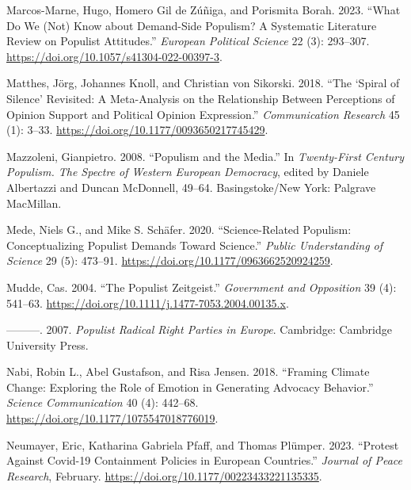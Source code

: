 \documentclass[
]{ccr}
\newlength{\cslhangindent}
\newlength{\cslentryspacingunit} %
\newenvironment{CSLReferences}[2] %
 {%
  \setlength{\parindent}{0pt}
  \ifodd #1
  \let\oldpar\par
  \def\par{\hangindent=\cslhangindent\oldpar}
  \fi
  \setlength{\parskip}{#2\cslentryspacingunit}
 }%
 {}
\begin{document}
\begin{CSLReferences}{1}{0}
\leavevmode{}%
Marcos-Marne, Hugo, Homero Gil de Zúñiga, and Porismita Borah. 2023.
{``What Do We (Not) Know about Demand-Side Populism? {A} Systematic
Literature Review on Populist Attitudes.''} \emph{European Political
Science} 22 (3): 293--307.
\url{https://doi.org/10.1057/s41304-022-00397-3}.

\leavevmode{}%
Matthes, Jörg, Johannes Knoll, and Christian von Sikorski. 2018. {``The
{`{Spiral} of {Silence}'} {Revisited}: {A Meta-Analysis} on the
{Relationship Between Perceptions} of {Opinion Support} and {Political
Opinion Expression}.''} \emph{Communication Research} 45 (1): 3--33.
\url{https://doi.org/10.1177/0093650217745429}.

\leavevmode{}%
Mazzoleni, Gianpietro. 2008. {``Populism and the Media.''} In
\emph{Twenty-First Century Populism. {The} Spectre of {Western European}
Democracy}, edited by Daniele Albertazzi and Duncan McDonnell, 49--64.
{Basingstoke/New York}: {Palgrave MacMillan}.

\leavevmode{}%
Mede, Niels G., and Mike S. Schäfer. 2020. {``Science-Related Populism:
{Conceptualizing} Populist Demands Toward Science.''} \emph{Public
Understanding of Science} 29 (5): 473--91.
\url{https://doi.org/10.1177/0963662520924259}.

\leavevmode{}%
Mudde, Cas. 2004. {``The Populist Zeitgeist.''} \emph{Government and
Opposition} 39 (4): 541--63.
\url{https://doi.org/10.1111/j.1477-7053.2004.00135.x}.

\leavevmode{}%
---------. 2007. \emph{Populist Radical Right Parties in {Europe}}.
{Cambridge}: {Cambridge University Press}.

\leavevmode{}%
Nabi, Robin L., Abel Gustafson, and Risa Jensen. 2018. {``Framing
{Climate Change}: {Exploring} the {Role} of {Emotion} in {Generating
Advocacy Behavior}.''} \emph{Science Communication} 40 (4): 442--68.
\url{https://doi.org/10.1177/1075547018776019}.

\leavevmode{}%
Neumayer, Eric, Katharina Gabriela Pfaff, and Thomas Plümper. 2023.
{``Protest Against {Covid-19} Containment Policies in {European}
Countries.''} \emph{Journal of Peace Research}, February.
\url{https://doi.org/10.1177/00223433221135335}.


\end{CSLReferences}
\end{document}
